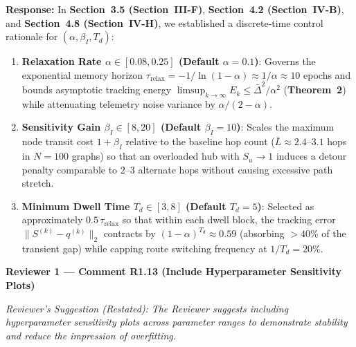 \documentclass[11pt,a4paper]{article}
\newcommand{\cbox}[2]{%
  \vspace{0.6em}\noindent\textbf{#1}\par\smallskip
  \noindent\textit{Reviewer's Suggestion (Restated):} \textit{#2}\par\smallskip
}
\begin{document}
\noindent\textbf{Response:} In \textbf{Section~3.5 (Section~III-F)}, \textbf{Section~4.2 (Section~IV-B)}, and \textbf{Section~4.8 (Section~IV-H)}, we established a discrete-time control rationale for $(\alpha, \beta_I, T_d)$:
\begin{enumerate}[leftmargin=1.8em]
    \item \textbf{Relaxation Rate $\alpha \in [0.08, 0.25]$ (Default $\alpha=0.1$)}: Governs the exponential memory horizon $\tau_{\text{relax}} = -1/\ln(1-\alpha) \approx 1/\alpha \approx 10$ epochs and bounds asymptotic tracking energy $\limsup_{k\to\infty} E_k \le \bar{\Delta}^2/\alpha^2$ (\textbf{Theorem~2}) while attenuating telemetry noise variance by $\alpha/(2-\alpha)$.
    \item \textbf{Sensitivity Gain $\beta_I \in [8, 20]$ (Default $\beta_I=10$)}: Scales the maximum node transit cost $1+\beta_I$ relative to the baseline hop count ($\bar{L} \approx 2.4$--$3.1$ hops in $N=100$ graphs) so that an overloaded hub with $S_u \to 1$ induces a detour penalty comparable to $2$--$3$ alternate hops without causing excessive path stretch.
    \item \textbf{Minimum Dwell Time $T_d \in [3, 8]$ (Default $T_d=5$)}: Selected as approximately $0.5\,\tau_{\text{relax}}$ so that within each dwell block, the tracking error $\|S^{(k)}-q^{(k)}\|_2$ contracts by $(1-\alpha)^{T_d} \approx 0.59$ (absorbing $>40\%$ of the transient gap) while capping route switching frequency at $1/T_d = 20\%$.
\end{enumerate}

\hrulefill

\cbox{Reviewer 1 --- Comment R1.13 (Include Hyperparameter Sensitivity Plots)}{The Reviewer suggests including hyperparameter sensitivity plots across parameter ranges to demonstrate stability and reduce the impression of overfitting.}
\end{document}
